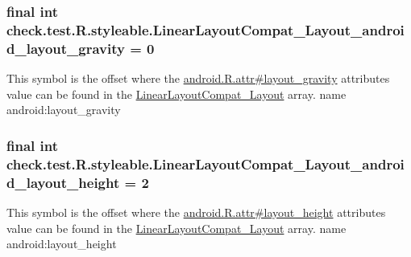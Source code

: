 \subsubsection[{Linear\+Layout\+Compat\+\_\+\+Layout\+\_\+android\+\_\+layout\+\_\+gravity}]{\setlength{\rightskip}{0pt plus 5cm}final int check.\+test.\+R.\+styleable.\+Linear\+Layout\+Compat\+\_\+\+Layout\+\_\+android\+\_\+layout\+\_\+gravity = 0\hspace{0.3cm}{\ttfamily [static]}}\label{classcheck_1_1test_1_1_r_1_1styleable_aa48e9aa39976dff71ce334a57bdf2be0}
This symbol is the offset where the \hyperlink{}{android.\+R.\+attr\#layout\+\_\+gravity} attribute\textquotesingle{}s value can be found in the \hyperlink{classcheck_1_1test_1_1_r_1_1styleable_a06b8cec0701fce506df2a245c8c71b9d}{Linear\+Layout\+Compat\+\_\+\+Layout} array.  name android\+:layout\+\_\+gravity \hypertarget{classcheck_1_1test_1_1_r_1_1styleable_a806ac33c9f85fe7dd05e4f470f07c354}{}
\subsubsection[{Linear\+Layout\+Compat\+\_\+\+Layout\+\_\+android\+\_\+layout\+\_\+height}]{\setlength{\rightskip}{0pt plus 5cm}final int check.\+test.\+R.\+styleable.\+Linear\+Layout\+Compat\+\_\+\+Layout\+\_\+android\+\_\+layout\+\_\+height = 2\hspace{0.3cm}{\ttfamily [static]}}\label{classcheck_1_1test_1_1_r_1_1styleable_a806ac33c9f85fe7dd05e4f470f07c354}
This symbol is the offset where the \hyperlink{}{android.\+R.\+attr\#layout\+\_\+height} attribute\textquotesingle{}s value can be found in the \hyperlink{classcheck_1_1test_1_1_r_1_1styleable_a06b8cec0701fce506df2a245c8c71b9d}{Linear\+Layout\+Compat\+\_\+\+Layout} array.  name android\+:layout\+\_\+height \hypertarget{classcheck_1_1test_1_1_r_1_1styleable_a299ea2d69f5676bd2a0f96a6d99a9be2}{}
